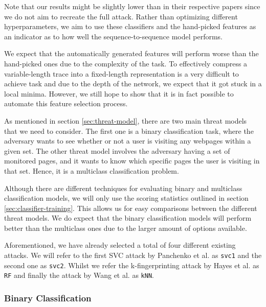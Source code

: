Note that our results might be slightly lower than in their respective papers since we do not aim to recreate the full attack.
Rather than optimizing different hyperparameters, we aim to use these classifiers and the hand-picked features as an indicator as to how well the sequence-to-sequence model performs.

We expect that the automatically generated features will perform worse than the hand-picked ones due to the complexity of the task.
To effectively compress a variable-length trace into a fixed-length representation is a very difficult to achieve task and due to the depth of the network, we expect that it got stuck in a local minima.
However, we still hope to show that it is in fact possible to automate this feature selection process.

As mentioned in section \ref{sec:threat-model}, there are two main threat models that we need to consider.
The first one is a binary classification task, where the adversary wants to see whether or not a user is visiting any webpages within a given set.
The other threat model involves the adversary having a set of monitored pages, and it wants to know which specific pages the user is visiting in that set.
Hence, it is a multiclass classification problem.

Although there are different techniques for evaluating binary and multiclass classification models, we will only use the scoring statistics outlined in section \ref{sec:classifier-training}.
This allows us for easy comparisons between the different threat models.
We do expect that the binary classification models will perform better than the multiclass ones due to the larger amount of options available.

Aforementioned, we have already selected a total of four different existing attacks.
We will refer to the first SVC attack by Panchenko et al. \cite{panchenko1} as \texttt{svc1} and the second one \cite{panchenko2} as \texttt{svc2}.
Whilst we refer the k-fingerprinting attack by Hayes et al. \cite{kfingerprinting} as \texttt{RF} and finally the attack by Wang et al. \cite{wang_cai_johnson_nithyanand_goldberg_2014} as \texttt{kNN}.

\subsubsection{Binary Classification}


